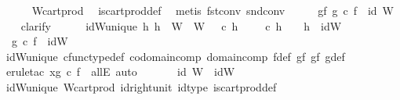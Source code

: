\begin{isabellebody}
\ \ \ \ \isamarkupfalse%
\ W{\isacharunderscore}{\kern0pt}cart{\isacharunderscore}{\kern0pt}prod\ \isamarkupfalse%
\ is{\isacharunderscore}{\kern0pt}cart{\isacharunderscore}{\kern0pt}prod{\isacharunderscore}{\kern0pt}def\ \isamarkupfalse%
\ {\isacharparenleft}{\kern0pt}metis\ fst{\isacharunderscore}{\kern0pt}conv\ snd{\isacharunderscore}{\kern0pt}conv{\isacharparenright}{\kern0pt}\isanewline
\ \ \isamarkupfalse%
\ \isamarkupfalse%
\ gf{\isacharcolon}{\kern0pt}\ {\isachardoublequoteopen}g\ {\isasymcirc}\isactrlsub c\ f\ {\isacharequal}{\kern0pt}\ id\ W{\isachardoublequoteclose}\isanewline
\ \ \isamarkupfalse%
\ clarify\isanewline
\ \ \ \ \isamarkupfalse%
\ idW{\isacharunderscore}{\kern0pt}unique{\isacharcolon}{\kern0pt}\ {\isachardoublequoteopen}{\isasymforall}h{}{\isachardot}{\kern0pt}\ h{}\ {\isacharcolon}{\kern0pt}\ W\ {\isasymrightarrow}\ W\ {\isasymand}\ {\isasympi}\ {\isasymcirc}\isactrlsub c\ h{}\ {\isacharequal}{\kern0pt}\ {\isasympi}\ {\isasymand}\ {\isasympi}\ {\isasymcirc}\isactrlsub c\ h{}\ {\isacharequal}{\kern0pt}\ {\isasympi}\ {\isasymlongrightarrow}\ h{}\ {\isacharequal}{\kern0pt}\ idW{\isachardoublequoteclose}\isanewline
\ \ \ \ \isamarkupfalse%
\ {}{\isacharcolon}{\kern0pt}\ {\isachardoublequoteopen}g\ {\isasymcirc}\isactrlsub c\ f\ {\isacharequal}{\kern0pt}\ idW{\isachardoublequoteclose}\isanewline
\ \ \ \ \ \ \isamarkupfalse%
\ idW{\isacharunderscore}{\kern0pt}unique\ cfunc{\isacharunderscore}{\kern0pt}type{\isacharunderscore}{\kern0pt}def\ codomain{\isacharunderscore}{\kern0pt}comp\ domain{\isacharunderscore}{\kern0pt}comp\ f{\isacharunderscore}{\kern0pt}def\ gf{}\ gf{}\ g{\isacharunderscore}{\kern0pt}def\ \isamarkupfalse%
\ {\isacharparenleft}{\kern0pt}erule{\isacharunderscore}{\kern0pt}tac\ x{\isacharequal}{\kern0pt}{\isachardoublequoteopen}g\ {\isasymcirc}\isactrlsub c\ f{\isachardoublequoteclose}\ \ allE{\isacharcomma}{\kern0pt}\ auto{\isacharparenright}{\kern0pt}\isanewline
\ \ \ \ \isamarkupfalse%
\ {}{\isacharcolon}{\kern0pt}\ {\isachardoublequoteopen}id\ W\ {\isacharequal}{\kern0pt}\ idW{\isachardoublequoteclose}\isanewline
\ \ \ \ \ \ \isamarkupfalse%
\ idW{\isacharunderscore}{\kern0pt}unique\ W{\isacharunderscore}{\kern0pt}cart{\isacharunderscore}{\kern0pt}prod\ id{\isacharunderscore}{\kern0pt}right{\isacharunderscore}{\kern0pt}unit{}\ id{\isacharunderscore}{\kern0pt}type\ is{\isacharunderscore}{\kern0pt}cart{\isacharunderscore}{\kern0pt}prod{\isacharunderscore}{\kern0pt}def\ \isamarkupfalse%

\end{isabellebody}
